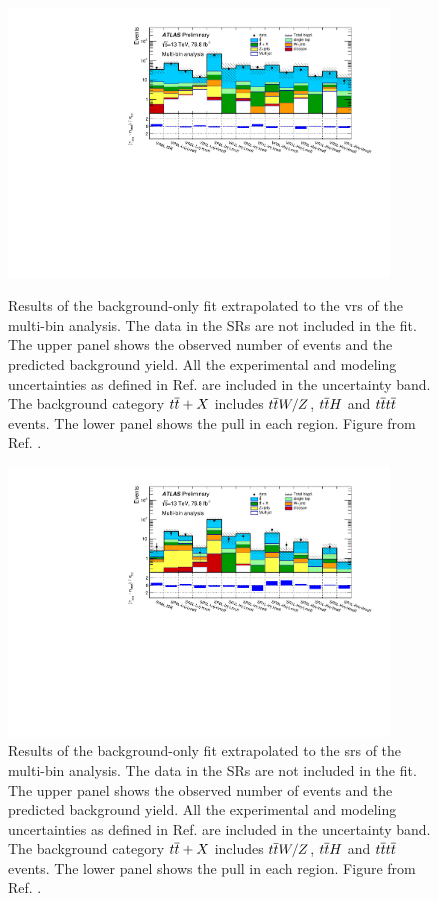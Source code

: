 \begin{figure}[htbp]
	\centering
	\includegraphics[width=0.9\textwidth]{figures/Chap8/Rizzi-Fig8-42.pdf}\\
	\caption{Results of the background-only fit extrapolated to the \glspl{vr} of the multi-bin analysis. 
	 The data in the  SRs are not included in the fit.  
	 The upper panel shows the observed number of events and the predicted background 
	yield. All the experimental and modeling uncertainties as defined in Ref. \cite{ATLAS-CONF-2018-041} are included in the uncertainty band. 
	The background 
	category $t\overline{t}+X$ includes $t\overline{t} W/Z$, $t\overline{t} H$ and $t\overline{t} t\overline{t}$ events. The lower panel shows the 
	pull in each region.
    Figure from Ref. \cite{ATLAS-CONF-2018-041}.	 }  
	\label{fig:pullVR_R21}
\end{figure}

\begin{figure}[htbp]
	\centering
    \includegraphics[width=0.9\textwidth]{figures/Chap8/Rizzi-Fig8-43.pdf}
	\caption{Results of the background-only fit extrapolated to the \glspl{sr}  of the multi-bin analysis. 
	 The data in the  SRs are not included in the fit.  
	 The upper panel shows the observed number of events and the predicted background 
	yield. All the experimental and modeling uncertainties as defined in Ref. \cite{ATLAS-CONF-2018-041} are included in the uncertainty band. 
	The background 
	category $t\overline{t}+X$ includes $t\overline{t} W/Z$, $t\overline{t} H$ and $t\overline{t} t\overline{t}$ events. The lower panel shows the 
	pull in each region.
    Figure from Ref. \cite{ATLAS-CONF-2018-041}.	 }  
	\label{fig:pullSR_R21}
\end{figure}

